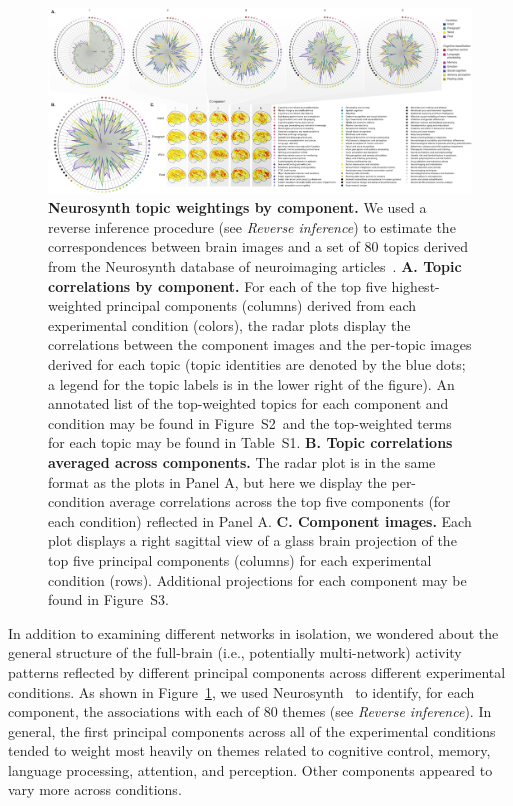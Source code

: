 \documentclass[english, 11pt]{article}
\newcommand{\topTerms}{S2}
\newcommand{\componentBrains}{S3}
\newcommand{\topics}{S1}
\begin{document}
\begin{figure}[tp]
  \centering
  \includegraphics[width=\textwidth]{figs/neurosynth_by_component}

\caption{\textbf{Neurosynth topic weightings by component.} We used a reverse
inference procedure (see \textit{Reverse inference}) to estimate the
correspondences between brain images and a set of 80 topics derived from the
Neurosynth database of neuroimaging articles~\citep{RubiEtal17}. \textbf{A.
Topic correlations by component.} For each of the top five highest-weighted
principal components (columns) derived from each experimental condition
(colors), the radar plots display the correlations between the component images
and the per-topic images derived for each topic (topic identities are denoted
by the blue dots; a legend for the topic labels is in the lower right of the
figure). An annotated list of the top-weighted topics for each component and
condition may be found in Figure~\topTerms~and the top-weighted terms for each
topic may be found in Table~\topics. \textbf{B. Topic correlations averaged
across components.} The radar plot is in the same format as the plots in Panel
A, but here we display the per-condition average correlations across the top
five components (for each condition) reflected in Panel A. \textbf{C. Component
images.} Each plot displays a right sagittal view of a glass brain projection of
the top five principal components (columns) for each experimental condition
(rows). Additional projections for each component may be found in
Figure~\componentBrains.}

\label{fig:neurosynth-pca}

\end{figure}

In addition to examining different networks in isolation, we wondered about the
general structure of the full-brain (i.e., potentially multi-network) activity
patterns reflected by different principal components across different
experimental conditions. As shown in Figure~\ref{fig:neurosynth-pca}, we used
Neurosynth~\citep{RubiEtal17} to identify, for each component, the associations
with each of 80 themes (see \textit{Reverse inference}).  In general, the first
principal components across all of the experimental conditions tended to weight
most heavily on themes related to cognitive control, memory,
language processing, attention, and perception.  Other components appeared to
vary more across conditions.
\end{document}

